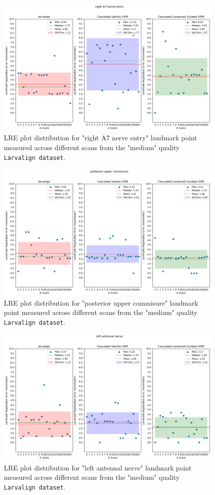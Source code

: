 \documentclass{book}
\begin{document}
	\begin{figure}[h!]
		\centering
		\includegraphics[width=0.75\columnwidth]{resources/chapter5_fresh/output/right A7 nerve entry.png}
		\caption{LRE plot distribution for "right A7 nerve entry" landmark point measured across different scans from the "medium" quality \texttt{Larvalign dataset}.}
		\label{fig:landmark27}
	\end{figure}
	
	\begin{figure}[h!]
		\centering
		\includegraphics[width=0.75\columnwidth]{resources/chapter5_fresh/output/posterior upper commisure.png}
		\caption{LRE plot distribution for "posterior upper commisure" landmark point measured across different scans from the "medium" quality \texttt{Larvalign dataset}.}
		\label{fig:landmark28}
	\end{figure}
	
	\begin{figure}[h!]
		\centering
		\includegraphics[width=0.75\columnwidth]{resources/chapter5_fresh/output/left antennal nerve.png}
		\caption{LRE plot distribution for "left antennal nerve" landmark point measured across different scans from the "medium" quality \texttt{Larvalign dataset}.}
		\label{fig:landmark29}
	\end{figure}
	
\end{document}
